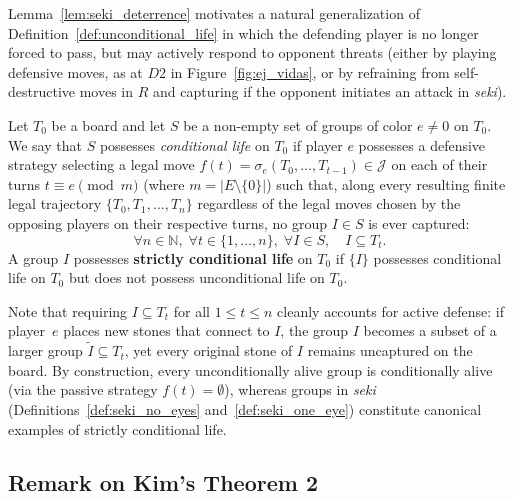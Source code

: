 Lemma~\ref{lem:seki_deterrence} motivates a natural generalization of Definition~\ref{def:unconditional_life} in which the defending player is no longer forced to pass, but may actively respond to opponent threats (either by playing defensive moves, as at $D2$ in Figure~\ref{fig:ej_vidas}, or by refraining from self-destructive moves in $R$ and capturing if the opponent initiates an attack in \textit{seki}).

\begin{definition}\label{def:conditional_life}
	Let $T_0$ be a board and let $S$ be a non-empty set of groups of color $e \neq 0$
	on $T_0$. We say that $S$ possesses \emph{conditional life} on $T_0$ if player $e$ possesses
	a defensive strategy selecting a legal move $f(t) = \sigma_e(T_0, \dots, T_{t-1})
	\in \mathcal{J}$ on each of their turns $t \equiv e \pmod m$ (where
	$m = |E \setminus \{0\}|$) such that, along every resulting finite legal
	trajectory $\{T_0, T_1, \dots, T_n\}$ regardless of the legal moves chosen by
	the opposing players on their respective turns, no group $I \in S$ is ever
	captured:
	\[
	\forall n \in \mathbb{N}, \; \forall t \in \{1, \dots, n\}, \; \forall I \in S, \quad I \subseteq T_t.
	\]
	A group $I$ possesses \textbf{strictly conditional life} on $T_0$ if $\{I\}$ possesses
	conditional life on $T_0$ but does not possess unconditional life on $T_0$.
\end{definition}

Note that requiring $I \subseteq T_t$ for all $1 \le t \le n$ cleanly accounts for active defense: if player~$e$ places new stones that connect to $I$, the group $I$ becomes a subset of a larger group $\tilde{I} \subseteq T_t$, yet every original stone of $I$ remains uncaptured on the board. By construction, every unconditionally alive group is conditionally alive (via the passive strategy $f(t) = \emptyset$), whereas groups in \textit{seki} (Definitions~\ref{def:seki_no_eyes} and~\ref{def:seki_one_eye}) constitute canonical examples of strictly conditional life.

\subsection{Remark on Kim's Theorem 2}

